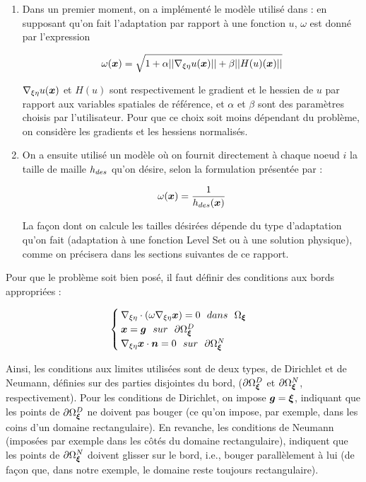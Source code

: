 \begin{enumerate}
	\item Dans un premier moment, on a implémenté le modèle utilisé dans \cite{arpaia} : en supposant qu'on fait l'adaptation par rapport à une fonction \(u\), \(\omega\) est donné par l'expression

	\begin{equation*}
  		\omega(\boldsymbol{x}) = \sqrt{1 + \alpha ||\nabla_{\xi\eta} u(\boldsymbol{x})|| + \beta ||H(u)(\boldsymbol{x})||}
	\end{equation*}

	\indent $\nabla_{\xi\eta} u(\boldsymbol{x})$ et \(H(u)\) sont respectivement le gradient et le hessien de \(u\) par rapport aux variables spatiales de référence, et \(\alpha\) et \(\beta\) sont des paramètres choisis par l'utilisateur. Pour que ce choix soit moins dépendant du problème, on considère les gradients et les hessiens normalisés.
	
	\item On a ensuite utilisé un modèle où on fournit directement à chaque noeud \(i\) la taille de maille \(h_{des}\) qu'on désire, selon la formulation présentée par \cite{askes} : 
	
	\begin{equation}
		\label{eq:omega2}
		\omega(\boldsymbol{x}) = \frac{1}{h_{des}(\boldsymbol{x})}
	\end{equation}
	
	\indent La façon dont on calcule les tailles désirées dépende du type d'adaptation qu'on fait (adaptation à une fonction Level Set ou à une solution physique), comme on précisera dans les sections suivantes de ce rapport.
	
	
\end{enumerate} 

\indent Pour que le problème soit bien posé, il faut définir des conditions aux bords appropriées : 

\begin{equation}
	\label{eq:systeme}
	\begin{cases}
  		\nabref \cdot \left( \omega \nabref \vecx \right) = 0 \ \ dans \ \ \domRef \\
  		\vecx = \vecg \ \ sur \ \ \bordRef^D \\
  		\nabref \vecx \cdot \vecn = 0 \ \ sur \ \ \bordRef^N 
	\end{cases}
\end{equation}

\indent Ainsi, les conditions aux limites utilisées sont de deux types, de Dirichlet et de Neumann, définies sur des parties disjointes du bord, (\(\partial \Omega_{\boldsymbol{\xi}}^D\) et \(\partial \Omega_{\boldsymbol{\xi}}^N\), respectivement). Pour les conditions de Dirichlet, on impose \(\boldsymbol{g} = \boldsymbol{\xi}\), indiquant que les points de \(\partial \Omega_{\boldsymbol{\xi}}^D\) ne doivent pas bouger (ce qu'on impose, par exemple, dans les coins d'un domaine rectangulaire). En revanche, les conditions de Neumann (imposées par exemple dans les côtés du domaine rectangulaire), indiquent que les points de \(\partial \Omega_{\boldsymbol{\xi}}^N\) doivent glisser sur le bord, i.e., bouger parallèlement à lui (de façon que, dans notre exemple, le domaine reste toujours rectangulaire).

